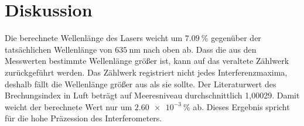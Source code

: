 \section{Diskussion}
\label{sec:Diskussion}

Die berechnete Wellenlänge des Lasers weicht um $\SI{7.09}{\percent}$ gegenüber der tatsächlichen Wellenlänge von $\SI{635}{\nano\meter}$ nach oben ab.
Dass die aus den Messwerten bestimmte Wellenlänge größer ist, kann auf das veraltete Zählwerk zurückgeführt werden.
Das Zählwerk registriert nicht jedes Interferenzmaxima, deshalb fällt die Wellenlänge größer aus als sie sollte.
Der Literaturwert des Brechungsindex in Luft beträgt auf Meeresniveau durchschnittlich 1,00029. \cite{brech}
Damit weicht der berechnete Wert nur um $\SI{2.60e-3}{\percent}$ ab.
Dieses Ergebnis spricht für die hohe Präzession des Interferometers.

